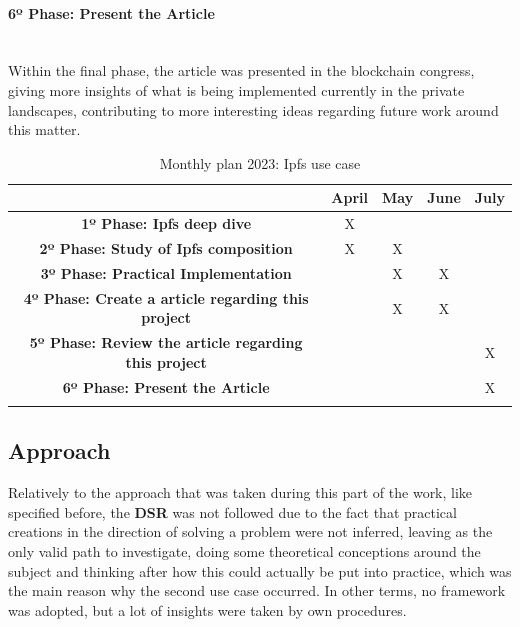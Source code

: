 \paragraph{6º Phase: Present the Article}\mbox{}\\
Within the final phase, the article was presented in the blockchain congress, giving more insights of what is being implemented currently in the private landscapes, contributing to more interesting ideas regarding future work around this matter. 

\begin{longtable}{|c|c|c|c|c|}
    \hline
    & \textbf{April}& \textbf{May} & \textbf{June} & \textbf{July}  \\ \hline

    \textbf{1º Phase: Ipfs deep dive}  & X & & & \\ \hline

    \textbf{2º Phase: Study of Ipfs composition} & X & X & & \\ \hline

    \textbf{3º Phase: Practical Implementation} & & X & X & \\ \hline

    \textbf{4º Phase: Create a article regarding this project} & & X & X &  \\ \hline

    \textbf{5º Phase: Review the article regarding this project} & & & & X \\ \hline

    \textbf{6º Phase: Present the Article} & & & & X \\ \hline
    
    \caption{Monthly plan 2023: Ipfs use case} \label{tab:activity_schedule} 
\end{longtable}

\subsection{Approach}
Relatively to the approach that was taken during this part of the work, like specified before, the \textbf{DSR} was not followed due to the fact that practical creations in the direction of solving a problem were not inferred, leaving as the only valid path to investigate, doing some theoretical conceptions around the subject and thinking after how this could actually be put into practice, which was the main reason why the second use case occurred. In other terms, no framework was adopted, but a lot of insights were taken by own procedures.

